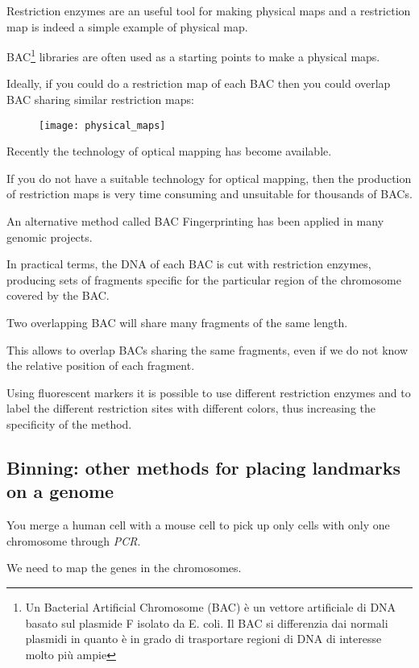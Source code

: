 Restriction enzymes are an useful tool for making physical maps and a
restriction map is indeed a simple example of physical map.

BAC\footnote{Un Bacterial Artificial Chromosome (BAC) è un vettore artificiale
di DNA basato sul plasmide F isolato da E. coli. Il BAC si differenzia dai
normali plasmidi in quanto è in grado di trasportare regioni di DNA di
interesse molto più ampie} libraries are often used as a starting points to
make a physical maps.

Ideally, if you could do a restriction map of each BAC then you could overlap
BAC sharing similar restriction maps:

\begin{figure}[H]
  \centering
  \texttt{[image: physical\_maps]}
  \caption{}
  \label{fig:physica_maps}
\end{figure}

Recently the technology of optical mapping has become available.

If you do not have a suitable technology for optical mapping, then the
production of restriction maps is very time consuming and unsuitable for
thousands of BACs.

An alternative method called BAC Fingerprinting has been applied in many
genomic projects.

In practical terms, the DNA of each BAC is cut with restriction enzymes,
producing sets of fragments specific for the particular region of the
chromosome covered by the BAC.

Two overlapping BAC will share many fragments of the same length.

This allows to overlap BACs sharing the same fragments, even if we do not know
the relative position of each fragment.

Using fluorescent markers it is possible to use different restriction enzymes
and to label the different restriction sites with different colors, thus
increasing the specificity of the method.

\subsection{Binning: other methods for placing landmarks on a genome}

You merge a human cell with a mouse cell to pick up only cells with only one
chromosome through \textit{PCR}.

We need to map the genes in the chromosomes.
